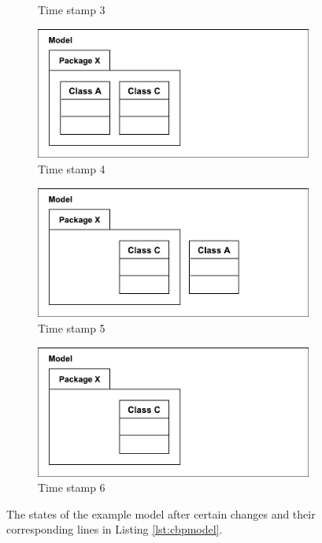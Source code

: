 \documentclass{llncs}
\begin{document}
\begin{figure}[t]
\begin{subfigure}[t]{0.329\linewidth}
        \caption{Time stamp 3}
        \label{fig:illustration_5}
    \end{subfigure}
    \hfill
    \begin{subfigure}[t]{0.329\linewidth}
        \centering
        \includegraphics[width=\linewidth]{images/illustration_6}
        \caption{Time stamp 4}
        \label{fig:illustration_6}
    \end{subfigure}
    \begin{subfigure}[t]{0.329\linewidth}
        \centering
        \includegraphics[width=\linewidth]{images/illustration_7}
        \caption{Time stamp 5}
        \label{fig:illustration_7}
    \end{subfigure}
    \begin{subfigure}[t]{0.329\linewidth}
        \centering
        \includegraphics[width=\linewidth]{images/illustration_8}
        \caption{Time stamp 6}
        \label{fig:illustration_8}
    \end{subfigure}
    
    \caption{The states of the example model after certain changes and their corresponding lines in Listing \ref{lst:cbpmodel}.}
    \label{fig:illustration_cbp}
\end{figure}
\end{document}
